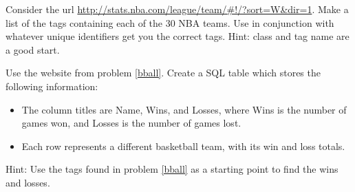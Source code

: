 \begin{problem}\label{bball}
Consider the url \url{http://stats.nba.com/league/team/#!/?sort=W&dir=1}.
Make a list of the  tags containing each of the 30 NBA teams.
Use  in conjunction with whatever unique identifiers get you the correct tags.
Hint: class and tag name are a good start.
\end{problem}

\begin{problem}
Use the website from problem \ref{bball}.
Create a SQL table which stores the following information:
\begin{itemize}
\item The column titles are Name, Wins, and Losses, where Wins is the number of games won, and Losses is the number of games lost.
\item Each row represents a different basketball team, with its win and loss totals.
\end{itemize}
Hint: Use the tags found in problem \ref{bball} as a starting point to find the wins and losses.
\end{problem}
